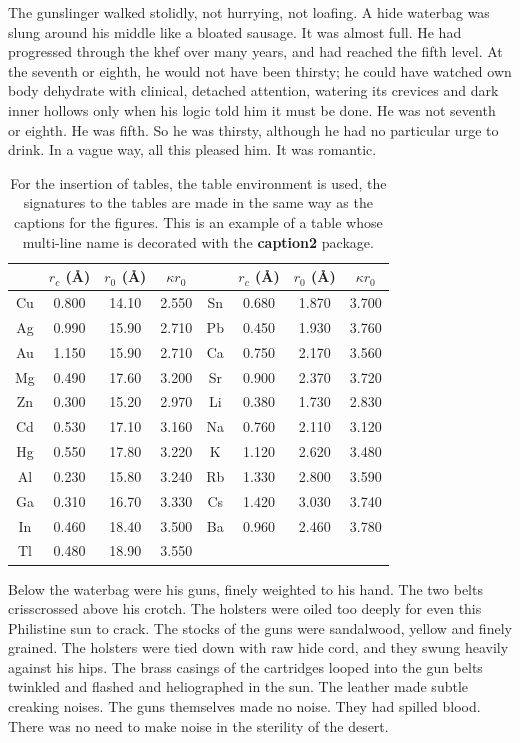 \documentclass[
11pt,%
tightenlines,%
twoside,%
onecolumn,%
nofloats,%
nobibnotes,%
nofootinbib,%
superscriptaddress,%
noshowpacs,%
centertags]%
{revtex4}
\begin{document}
The gunslinger walked stolidly, not hurrying, not loafing. A hide waterbag was slung around his middle like a bloated sausage. It was almost full. He had progressed through the khef over many years, and had reached the fifth level. At the seventh or eighth, he would not have been thirsty; he could have watched own body dehydrate with clinical, detached attention, watering its crevices and dark inner hollows only when his logic told him it must be done. He was not seventh or eighth. He was fifth. So he was thirsty, although he had no particular urge to drink. In a vague way, all this pleased him. It was romantic.

\begin{table}[!h]
\setcaptionmargin{0mm}
\onelinecaptionsfalse
{}
\caption{ For the insertion of tables, the table environment is used,
 the signatures to the tables are made in the same way as the captions
 for the figures. This is an example of a table whose multi-line name
 is decorated with the \textbf{caption2} package.}
\bigskip
\begin{tabular}{|c|c|c|c|c|c|c|c|}
\hline
 &$r_c$ (\AA)&$r_0$ (\AA)&$\kappa r_0$&
 &$r_c$ (\AA) &$r_0$ (\AA)&$\kappa r_0$\\
\hline
Cu& 0.800 & 14.10 & 2.550 &Sn
& 0.680 & 1.870 & 3.700 \\
Ag& 0.990 & 15.90 & 2.710 &Pb
& 0.450 & 1.930 & 3.760 \\
Au& 1.150 & 15.90 & 2.710 &Ca
& 0.750 & 2.170 & 3.560 \\
Mg& 0.490 & 17.60 & 3.200 &Sr
& 0.900 & 2.370 & 3.720 \\
Zn& 0.300 & 15.20 & 2.970 &Li
& 0.380 & 1.730 & 2.830 \\
Cd& 0.530 & 17.10 & 3.160 &Na
& 0.760 & 2.110 & 3.120 \\
Hg& 0.550 & 17.80 & 3.220 &K &  1.120 & 2.620 & 3.480 \\
Al& 0.230 & 15.80 & 3.240 &Rb & 1.330 & 2.800 & 3.590 \\
Ga& 0.310 & 16.70 & 3.330 &Cs & 1.420 & 3.030 & 3.740 \\
In& 0.460 & 18.40 & 3.500 &Ba & 0.960 & 2.460 & 3.780 \\
Tl& 0.480 & 18.90 & 3.550 & & & & \\[1mm]
\hline
\end{tabular}
\end{table}

Below the waterbag were his guns, finely weighted to his hand. The two belts crisscrossed above his crotch. The holsters were oiled too deeply for even this Philistine sun to crack. The stocks of the guns were sandalwood, yellow and finely grained. The holsters were tied down with raw hide cord, and they swung heavily against his hips. The brass casings of the cartridges looped into the gun belts twinkled and flashed and heliographed in the sun. The leather made subtle creaking noises. The guns themselves made no noise. They had spilled blood. There was no need to make noise in the sterility of the desert.
\end{document}
